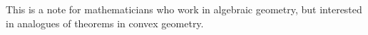 This is a note for mathematicians who work in algebraic geometry, but interested in analogues of theorems in convex geometry. 

